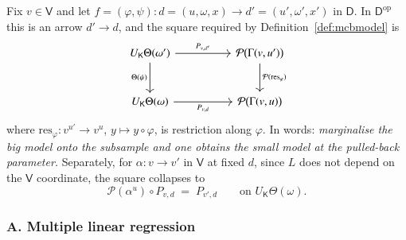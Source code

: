 \documentclass[11pt,a4paper]{article}
\theoremstyle{plain}
\theoremstyle{definition}
\theoremstyle{remark}
\newcommand{\cat}[1]{\mathsf{#1}}
\newcommand{\catV}{\cat{V}}
\newcommand{\catD}{\cat{D}}
\newcommand{\catK}{\cat{K}}
\newcommand{\Prb}{\mathcal{P}}
\newcommand{\op}{\mathrm{op}}
\newcommand{\res}{\mathrm{res}}
\begin{document}
Fix $v \in \catV$ and let
$f = (\varphi,\psi) \colon d=(u,\omega,x) \to d'=(u',\omega',x')$ in $\catD$.
In $\catD^{\op}$ this is an arrow $d' \to d$, and the square required by
Definition~\ref{def:mcbmodel} is
\begin{equation}\label{eq:ND}
\begin{tikzcd}[column sep=5em, row sep=2.6em]
U_{\catK}\Theta(\omega') \arrow[r,"P_{v,d'}"] \arrow[d,"\Theta(\psi)"'] &
\Prb\bigl(\Gamma(v,u')\bigr) \arrow[d,"\Prb(\res_{\varphi})"] \\
U_{\catK}\Theta(\omega) \arrow[r,"P_{v,d}"'] &
\Prb\bigl(\Gamma(v,u)\bigr)
\end{tikzcd}
\end{equation}
where $\res_{\varphi} \colon v^{u'} \to v^{u}$, $y \mapsto y\circ\varphi$, is
restriction along $\varphi$. In words: \emph{marginalise the big model onto
the subsample and one obtains the small model at the pulled-back parameter.}
Separately, for $\alpha \colon v \to v'$ in $\catV$ at fixed $d$, since $L$
does not depend on the $\catV$ coordinate, the square collapses to
\begin{equation}\label{eq:NV}
\Prb(\alpha^{u}) \circ P_{v,d} \;=\; P_{v',d}
\qquad\text{on } U_{\catK}\Theta(\omega).
\end{equation}

\subsubsection*{A. Multiple linear regression}
\end{document}
